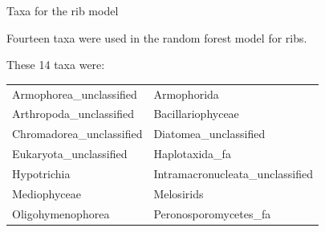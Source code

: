 \documentclass{beamer}
\begin{document}
\begin{frame}{Taxa for the rib model}

  {\footnotesize
    
  \noindent  Fourteen taxa were used in the random forest model for ribs.
  
  \vspace{0.1in}

  \noindent These 14 taxa were:
  
  \vspace{0.05in}

  \begin{tabular}{ll}
    Armophorea\_unclassified & Armophorida\\
    Arthropoda\_unclassified & Bacillariophyceae\\
    Chromadorea\_unclassified & Diatomea\_unclassified\\
    Eukaryota\_unclassified &  Haplotaxida\_fa\\
    Hypotrichia & Intramacronucleata\_unclassified\\
    Mediophyceae & Melosirids\\
    Oligohymenophorea & Peronosporomycetes\_fa          
  \end{tabular}
  }

\end{frame}
\end{document}
